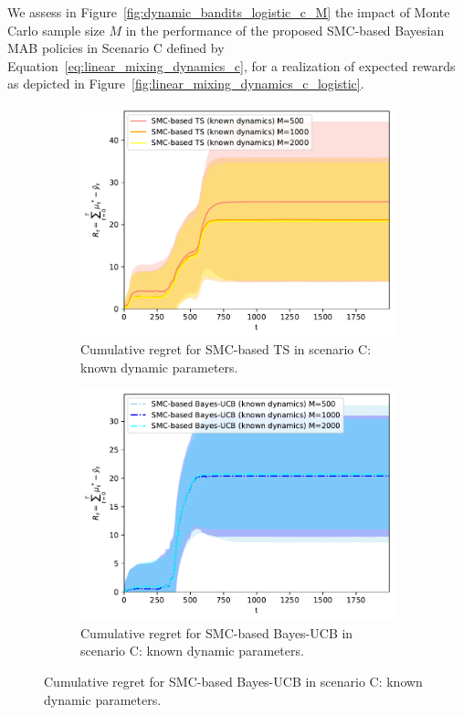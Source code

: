 
We assess in Figure~\ref{fig:dynamic_bandits_logistic_c_M} the impact of Monte Carlo sample size $M$ in the performance of the proposed SMC-based Bayesian MAB policies
in Scenario C defined by Equation~\eqref{eq:linear_mixing_dynamics_c},
for a realization of expected rewards as depicted in Figure~\ref{fig:linear_mixing_dynamics_c_logistic}.

\begin{figure}[!h]
	\centering
	\begin{subfigure}[b]{0.45\textwidth}
		\includegraphics[width=\textwidth]{./fods_figs/dynamic/logistic/c_selectedM_cumulative_regret_dknown_ts}
		\caption{Cumulative regret for SMC-based TS in scenario C: known dynamic parameters.}
		\label{fig:dynamic_bandits_logistic_c_ts_dknown_M}
	\end{subfigure}\qquad
	\begin{subfigure}[b]{0.45\textwidth}
		\includegraphics[width=\textwidth]{./fods_figs/dynamic/logistic/c_selectedM_cumulative_regret_dknown_bucb}
		\caption{Cumulative regret for SMC-based Bayes-UCB in scenario C: known dynamic parameters.}
		\label{fig:dynamic_bandits_logistic_c_bucb_dknown_M}
	\end{subfigure}
	

\end{figure}
